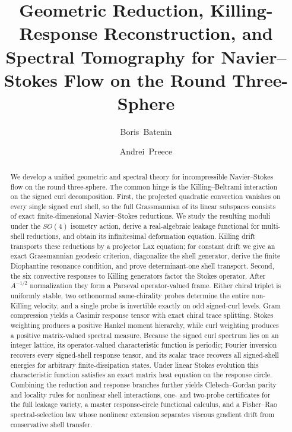 \documentclass[
 aps,
 prd,
 reprint,
 amsmath,
 amssymb,
 nofootinbib,
 superscriptaddress
]{revtex4-2}
\theoremstyle{definition}
\theoremstyle{remark}
\begin{document}
\title{Geometric Reduction, Killing-Response Reconstruction, and Spectral Tomography for Navier--Stokes Flow on the Round Three-Sphere}

\author{Boris~Batenin}

\author{Andrei~Preece}

\begin{abstract}
We develop a unified geometric and spectral theory for incompressible
Navier--Stokes flow on the round three-sphere.  The common hinge is the
Killing--Beltrami interaction on the signed curl decomposition.  First, the
projected quadratic convection vanishes on every single signed curl shell,
so the full Grassmannian of its linear subspaces consists of exact
finite-dimensional Navier--Stokes reductions.  We study the resulting
moduli under the $SO(4)$ isometry action, derive a real-algebraic leakage
functional for multi-shell reductions, and obtain its infinitesimal
deformation equation.  Killing drift transports these reductions by a
projector Lax equation; for constant drift we give an exact Grassmannian
geodesic criterion, diagonalize the shell generator, derive the finite
Diophantine resonance condition, and prove determinant-one shell transport.
Second, the six convective responses to Killing generators factor the
Stokes operator.  After $A^{-1/2}$ normalization they form a Parseval
operator-valued frame.  Either chiral triplet is uniformly stable, two
orthonormal same-chirality probes determine the entire non-Killing velocity,
and a single probe is invertible exactly on odd signed-curl levels.  Gram
compression yields a Casimir response tensor with exact chiral trace
splitting.  Stokes weighting produces a positive Hankel moment hierarchy,
while curl weighting produces a positive matrix-valued spectral measure.
Because the signed curl spectrum lies on an integer lattice, its
operator-valued characteristic function is periodic; Fourier inversion
recovers every signed-shell response tensor, and its scalar trace recovers
all signed-shell energies for arbitrary finite-dissipation states.  Under
linear Stokes evolution this characteristic function satisfies an exact
matrix heat equation on the response circle.  Combining the reduction and
response branches further yields Clebsch--Gordan parity and locality rules
for nonlinear shell interactions, one- and two-probe certificates for the
full leakage variety, a master response-circle functional calculus, and a
Fisher--Rao spectral-selection law whose nonlinear extension separates
viscous gradient drift from conservative shell transfer.
\end{abstract}
\maketitle
\end{document}
